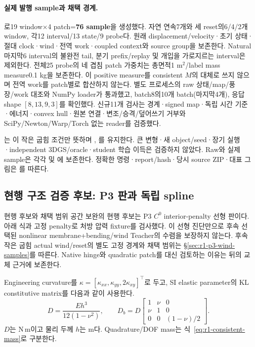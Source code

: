 \documentclass[10pt]{article}
\begin{document}
\paragraph{실제 발행 sample과 채택 경계.}
로19 window$\times$4 patch=\textbf{76 sample}을 생성했다.
자연 연속7개와 세 reset의6/4/2개 window, 각12 interval/13 state/9 probe다.
원래 displacement/velocity·초기 상태·절대 clock·wind·전역 work·coupled context와 source group을 보존한다.
Natural 마지막6 interval의 불완전 tail, 분기 prefix/replay 및 개입을 가로지르는 interval은 제외한다.
전체25 probe의 네 겹침 patch 가중치는 총면적1 m$^2$/label mass measure0.1 kg을 보존한다.
이 positive measure를 consistent \(M\)의 대체로 쓰지 않으며 전역 work를 patch별로 합산하지 않는다.
별도 프로세스의 raw 상태/map/풍장/work 대조와 NumPy loader가 통과했고,
batch8의10개 batch(마지막4개), 응답 shape \([8,13,9,3]\)를 확인했다.
신규11개 검사는 경계·signed map·독립 시간 기준·에너지·convex hull·원본 연결·변조/승격/덮어쓰기 거부와
SciPy/Newton/Warp/Torch 없는 reader를 검증했다.

는 이 작은 굽힘 조건만 뜻하며
, 를 유지한다.
큰 변형·새 object/seed·장기 실행·independent 3DGS/oracle·student 학습 이득은 검증하지 않았다.
Raw와 실제 sample은 각각  및
에 보존한다.
정확한 명령·report/hash·당시 source ZIP·대표 그림은
를 따른다.

\subsection{현행 구조 검증 후보: P3 판과 독립 spline}
\label{sec:r1-current-plate}

\begin{decisionbox}{현행 후보와 채택 범위}
공간 보완의 현행 후보는 P3 \(C^0\) interior-penalty 선형 판이다. 아래 식과 고정 penalty로
처방 압력 fixture를 검사했다. 이 선형 진단만으로 후속 선택된 nonlinear membrane+bending/wind Teacher의 수렴을 보장하지 않는다.
후속 작은 굽힘 actual wind/reset의 별도 고정 경계와 채택 범위는 \S\ref{sec:r1-p3-wind-samples}를 따른다.
Native hinge와 quadratic patch를 대신 검토하는 이유는 뒤의 교체 근거에 보존한다.
\end{decisionbox}

Engineering curvature를 \(\kappa=[\kappa_{xx},\kappa_{yy},2\kappa_{xy}]^\top\)로 두고,
SI elastic parameter의 KL constitutive matrix를 다음과 같이 사용한다.
\begin{equation}
 D=\frac{Eh^3}{12(1-\nu^2)},\qquad
 D_b=D\begin{bmatrix}1&\nu&0\\\nu&1&0\\0&0&(1-\nu)/2\end{bmatrix}.
 \label{eq:r1-plate-constitutive}
\end{equation}
\(D\)는 N\,m이고 물리 두께 \(h\)는 m다. Quadrature/DOF mass는
식~\eqref{eq:r1-consistent-mass}로 구분한다.
\end{document}
